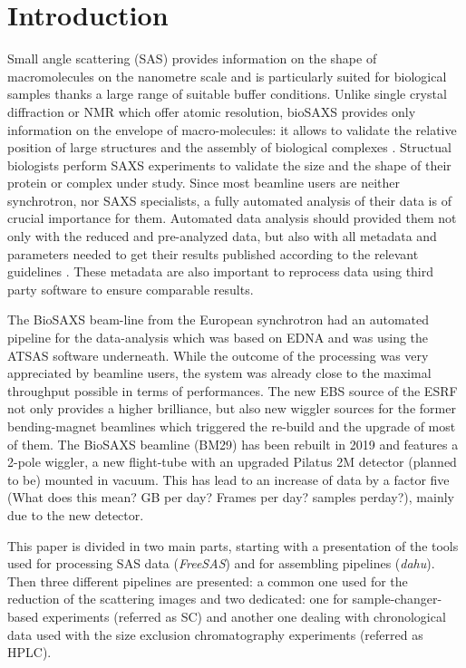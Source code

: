 \documentclass[preprint]{iucr}              %
\begin{document}
\section{Introduction}
Small angle scattering (SAS) provides information on the shape of macromolecules on the nanometre scale and is  
particularly suited for biological samples thanks a large range of suitable buffer conditions.
Unlike single crystal diffraction or NMR which offer atomic resolution, bioSAXS provides only information on the envelope of macro-molecules: it allows to validate the relative position of large structures and the assembly of biological complexes \cite{biosaxs_rev2018}. 
Structual biologists perform SAXS experiments to validate the size and the shape of their protein or complex under study. 
Since most beamline users are neither synchrotron, nor SAXS specialists, a fully automated analysis of their data is of crucial importance for them. 
Automated data analysis should provided them not only with the reduced and pre-analyzed data, but also with all metadata and parameters needed to get their results published according to the relevant guidelines \cite{guidelines_2017}.
These metadata are also important to reprocess data using third party software to ensure comparable results. 

The BioSAXS beam-line from the European synchrotron \cite{BM29paper} had an automated pipeline for the data-analysis which was based on EDNA \cite{edna} and was using the ATSAS \cite{ATSAS2} software underneath. 
While the outcome of the processing was very appreciated by beamline users, the system was already close to the maximal throughput possible in terms of performances. 
The new EBS source \cite{EBS} of the ESRF not only provides a higher brilliance, but also new wiggler sources for the former bending-magnet beamlines which triggered the re-build and the upgrade of most of them. 
The BioSAXS beamline (BM29) has been rebuilt in 2019 and features a  2-pole wiggler, a new flight-tube with an upgraded  Pilatus 2M detector (planned to be) mounted in vacuum. 
This has lead to an increase of data by a factor five (What does this mean? GB per day? Frames per day? samples perday?), mainly due to the new detector. 

This paper is divided in two main parts, starting with a presentation of the tools used for 
processing SAS data (\textit{FreeSAS}) and for assembling pipelines (\textit{dahu}).
Then three different pipelines are presented: a common one used for the reduction of the scattering images and two dedicated: one for sample-changer-based experiments (referred as SC) and another one dealing with chronological data used with the size exclusion chromatography experiments (referred as HPLC).
\end{document}
